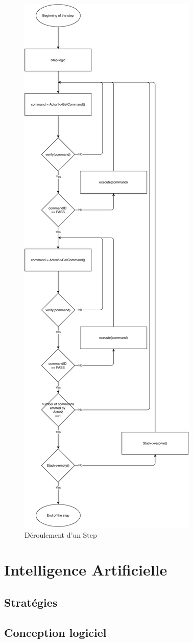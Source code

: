 \documentclass[a4paper,12pt]{article}
\begin{document}
\begin{figure}[h]
\begin{center}
\includegraphics[width=.4\textwidth]{StepFlowchart.pdf}
\caption{\label{step}Déroulement d'un Step}
\end{center}
\end{figure}

\clearpage

\section{Intelligence Artificielle}

\subsection{Stratégies}

\clearpage
\subsection{Conception logiciel}
\end{document}
